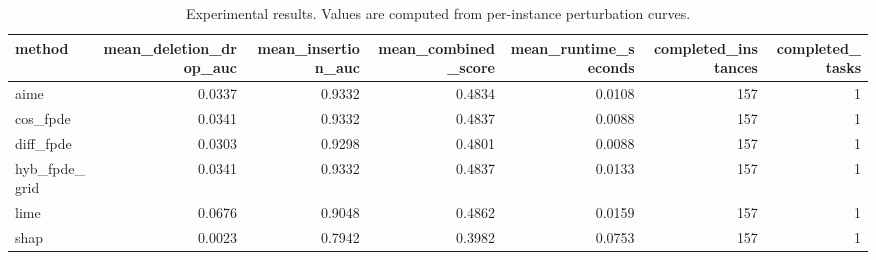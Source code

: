 \begin{table}[t]
\caption{Experimental results. Values are computed from per-instance perturbation curves.}
\label{tab:main_results_computed}
\centering
\begin{tabular}{lrrrrrr}
\toprule
method & mean\_deletion\_drop\_auc & mean\_insertion\_auc & mean\_combined\_score & mean\_runtime\_seconds & completed\_instances & completed\_tasks \\
\midrule
aime & 0.0337 & 0.9332 & 0.4834 & 0.0108 & 157 & 1 \\
cos\_fpde & 0.0341 & 0.9332 & 0.4837 & 0.0088 & 157 & 1 \\
diff\_fpde & 0.0303 & 0.9298 & 0.4801 & 0.0088 & 157 & 1 \\
hyb\_fpde\_grid & 0.0341 & 0.9332 & 0.4837 & 0.0133 & 157 & 1 \\
lime & 0.0676 & 0.9048 & 0.4862 & 0.0159 & 157 & 1 \\
shap & 0.0023 & 0.7942 & 0.3982 & 0.0753 & 157 & 1 \\
\bottomrule
\end{tabular}

\end{table}
